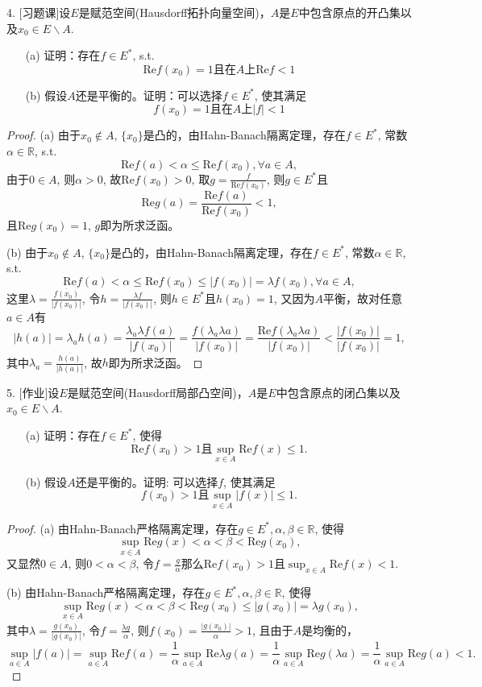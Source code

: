 \documentclass[a4paper,8pt]{ctexart}\textwidth 140mm \textheight 216mm
\newcommand{\8}{\infty}
\renewcommand{\Re}{\mathrm{Re}}
\begin{document}
4. [习题课]设$E$是赋范空间(Hausdorff拓扑向量空间)，$A$是$E$中包含原点的开凸集以及$x_0\in E\backslash A$.
\begin{itemize}
	\item[(a)] 证明：存在$f\in E^*$, s.t.
	\begin{equation*}
	\mathrm{Re}f(x_0)=1\mbox{且在}A\mbox{上}\mathrm{Re}f<1
	\end{equation*}
	\item[(b)] 假设$A$还是平衡的。证明：可以选择$f\in E^*$, 使其满足
	\begin{equation*}
	f(x_0)=1\mbox{且在}A\mbox{上}|f|<1
	\end{equation*}
\end{itemize}
\begin{proof}
	(a) 由于$x_0\notin A$, $\{x_0\}$是凸的，由Hahn-Banach隔离定理，存在$f\in E^*$, 常数$\alpha\in\mathbb{R}$, s.t. 
	$$\mathrm{Re}f(a)<\alpha\leq \mathrm{Re} f(x_0),\forall a\in A,$$
	由于$0\in A$, 则$\alpha>0$,  故$\mathrm{Re}f(x_0)>0$, 取$g=\frac{f}{\mathrm{Re}f(x_0)}$, 则$g\in E^*$且
	$$\mathrm{Re}g(a)=\frac{\mathrm{Re}f(a)}{\mathrm{Re}f(x_0)}<1,$$
	且$\mathrm{Re} g(x_0)=1$, $g$即为所求泛函。
	
	(b) 由于$x_0\notin A$, $\{x_0\}$是凸的，由Hahn-Banach隔离定理，存在$f\in E^*$, 常数$\alpha\in\mathbb{R}$, s.t. 
	$$\mathrm{Re}f(a)<\alpha\leq \mathrm{Re} f(x_0)\leq|f(x_0)|=\lambda f(x_0),\forall a\in A,$$
	这里$\lambda=\frac{\overline{f(x_0)}}{|f(x_0)|}$, 
	令$h=\frac{\lambda f}{|f(x_0)|}$, 则$h\in E^*$且$h(x_0)=1$, 又因为$A$平衡，故对任意$a\in A$有
	$$|h(a)|=\lambda_ah(a)=\frac{\lambda_a \lambda f(a)}{|f(x_0)|}=\frac{f(\lambda_a\lambda a)}{|f(x_0)|}=\frac{\mathrm{Re} f(\lambda_a\lambda a)}{|f(x_0)|}<\frac{|f(x_0)|}{|f(x_0)|}=1,$$
	其中$\lambda_a=\frac{\overline{h(a)}}{|h(a)|}$, 故$h$即为所求泛函。
\end{proof}

5. [作业]设$E$是赋范空间(Hausdorff局部凸空间)，$A$是$E$中包含原点的闭凸集以及$x_0\in E\backslash A$.
\begin{itemize}
	\item[(a)] 证明：存在$f\in E^*$, 使得
	$$\mathrm{Re} f(x_0)>1\mbox{且}\sup_{x\in A}\mathrm{Re} f(x)\leq 1.$$
	\item[(b)] 假设$A$还是平衡的。证明: 可以选择$f$, 使其满足
	$$f(x_0)>1\mbox{且}\sup_{x\in A}|f(x)|\leq 1.$$
\end{itemize}
\begin{proof}
	(a) 由Hahn-Banach严格隔离定理，存在$g\in E^*,\alpha,\beta\in\mathbb{R}$, 使得
	$$\sup_{x\in A}\mathrm{Re}g(x)<\alpha<\beta<\Re g(x_0),$$
	又显然$0\in A$, 则$0<\alpha<\beta$, 令$f=\frac{g}{\alpha}$那么$\Re f(x_0)>1$且$\sup_{x\in A}\Re f(x)<1$.
	
	(b) 由Hahn-Banach严格隔离定理，存在$g\in E^*,\alpha,\beta\in\mathbb{R}$, 使得
	$$\sup_{x\in A}\mathrm{Re}g(x)<\alpha<\beta<\Re g(x_0)\leq|g(x_0)|=\lambda g(x_0),$$
	其中$\lambda=\frac{\overline{g(x_0)}}{|g(x_0)|}$, 令$f=\frac{\lambda g}{\alpha}$, 则$f(x_0)=\frac{|g(x_0)|}{\alpha}>1$, 且由于$A$是均衡的，
	$$\sup_{a\in A}|f(a)|=\sup_{a\in A}\Re f(a)=\frac{1}{\alpha}\sup_{a\in A}\Re \lambda g(a)=\frac{1}{\alpha}\sup_{a\in A}\Re g(\lambda a)=\frac{1}{\alpha}\sup_{a\in A}\Re g(a)<1.$$
\end{proof}
\end{document}
